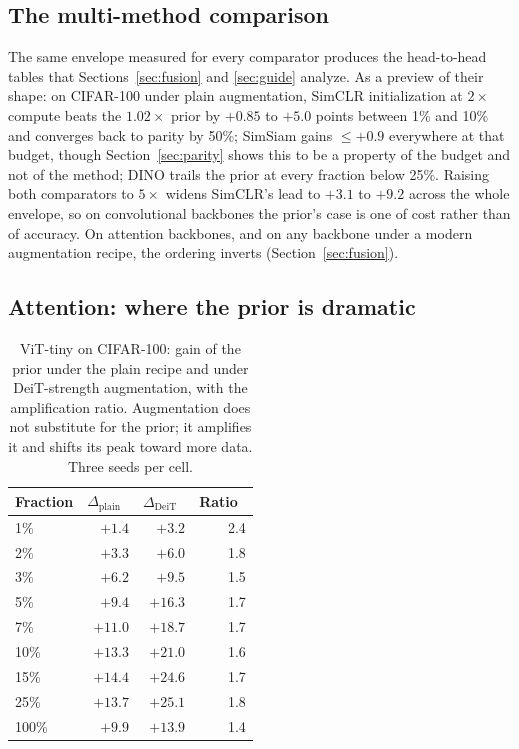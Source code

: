 \subsection{The multi-method comparison}\label{sec:multimethod}
The same envelope measured for every comparator produces the head-to-head
tables that Sections~\ref{sec:fusion} and \ref{sec:guide} analyze. As a
preview of their shape: on CIFAR-100 under plain augmentation, SimCLR
initialization at $2\times$ compute beats the $1.02\times$ prior by
$+0.85$ to $+5.0$ points between 1\% and 10\% and converges back to
parity by 50\%; SimSiam gains ${\leq}+0.9$ everywhere at that budget,
though Section~\ref{sec:parity} shows this to be a property of the budget
and not of the method; DINO trails the prior at every fraction below
25\%. Raising both comparators to $5\times$ widens SimCLR's lead to
$+3.1$ to $+9.2$ across the whole envelope, so on convolutional backbones
the prior's case is one of cost rather than of accuracy. On attention
backbones, and on any backbone under a modern augmentation recipe, the
ordering inverts (Section~\ref{sec:fusion}).

\subsection{Attention: where the prior is dramatic}\label{sec:attention}
\begin{table}[t]
\caption{ViT-tiny on CIFAR-100: gain of the prior under the plain recipe
and under DeiT-strength augmentation, with the amplification ratio.
Augmentation does not substitute for the prior; it amplifies it and
shifts its peak toward more data. Three seeds per cell.}
\label{tab:vitenvelope}
\centering\scriptsize
\setlength{\tabcolsep}{2.6pt}
\begin{tabular}{@{}lrrr@{}}
\toprule
Fraction & $\Delta_{\mathrm{plain}}$~\up & $\Delta_{\mathrm{DeiT}}$~\up & Ratio~\up \\
\midrule
1\%   & $+1.4$  & $+3.2$            & 2.4 \\
2\%   & $+3.3$  & $+6.0$            & 1.8 \\
3\%   & $+6.2$  & $+9.5$            & 1.5 \\
5\%   & $+9.4$  & $+16.3$           & 1.7 \\
7\%   & $+11.0$ & $+18.7$           & 1.7 \\
10\%  & $+13.3$ & $+21.0$           & 1.6 \\
15\%  & $\mathbf{+14.4}$ & $+24.6$  & 1.7 \\
25\%  & $+13.7$ & $\mathbf{+25.1}$  & 1.8 \\
100\% & $+9.9$  & $+13.9$           & 1.4 \\
\bottomrule
\end{tabular}
\end{table}


